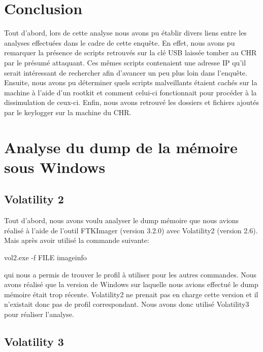 \documentclass[a4paper]{article}
\begin{document}
\section{Conclusion}

Tout d'abord, lors de cette analyse nous avons pu établir divers liens entre les analyses effectuées dans le cadre de cette enquête. En effet, nous avons pu remarquer la présence de scripts retrouvés sur la clé USB laissée tomber au CHR par le présumé attaquant. Ces mêmes scripts contenaient une adresse IP qu'il serait intéressant de rechercher afin d'avancer un peu plus loin dans l'enquête. Ensuite, nous avons pu déterminer quels scripts malveillants étaient cachés sur la machine à l'aide d'un rootkit et comment celui-ci fonctionnait pour procéder à la dissimulation de ceux-ci. Enfin, nous avons retrouvé les dossiers et fichiers ajoutés par le keylogger sur la machine du CHR.










\newpage \appendix

\section{Analyse du dump de la mémoire sous Windows}



\subsection{Volatility 2}

Tout d'abord, nous avons voulu analyser le dump mémoire que nous avions réalisé à l'aide de l'outil FTKImager (version 3.2.0) avec Volatility2 (version 2.6). Mais après avoir utilisé la commande suivante:
\begin{example}
    vol2.exe -f FILE imageinfo
\end{example}
qui nous a permis de trouver le profil à utiliser pour les autres commandes. Nous avons réalisé que la version de Windows sur laquelle nous avions effectué le dump mémoire était trop récente. Volatility2 ne prenait pas en charge cette version et il n'existait donc pas de profil correspondant. Nous avons donc utilisé Volatility3 pour réaliser l'analyse.



\subsection{Volatility 3}
\end{document}

